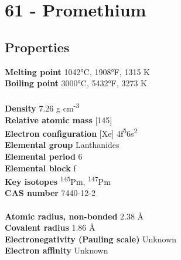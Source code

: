 \section{61 - Promethium}
\label{sec:elem-promethium}
\subsection{Properties}
\textbf{Melting point} 1042°C, 1908°F, 1315 K\\
\textbf{Boiling point} 3000°C, 5432°F, 3273 K\\
\\
\textbf{Density} 7.26 g cm\textsuperscript{-3}\\
\textbf{Relative atomic mass} [145]\\
\textbf{Electron configuration} [Xe] 4f\textsuperscript{5}6s\textsuperscript{2}\\
\textbf{Elemental group} Lanthanides\\
\textbf{Elemental period} 6\\
\textbf{Elemental block} f\\
\textbf{Key isotopes} \textsuperscript{145}Pm, \textsuperscript{147}Pm\\
\textbf{CAS number} 7440-12-2\\
\\
\textbf{Atomic radius, non-bonded} 2.38 Å\\
\textbf{Covalent radius} 1.86 Å\\
\textbf{Electronegativity (Pauling scale)} Unknown\\
\textbf{Electron affinity} Unknown\\